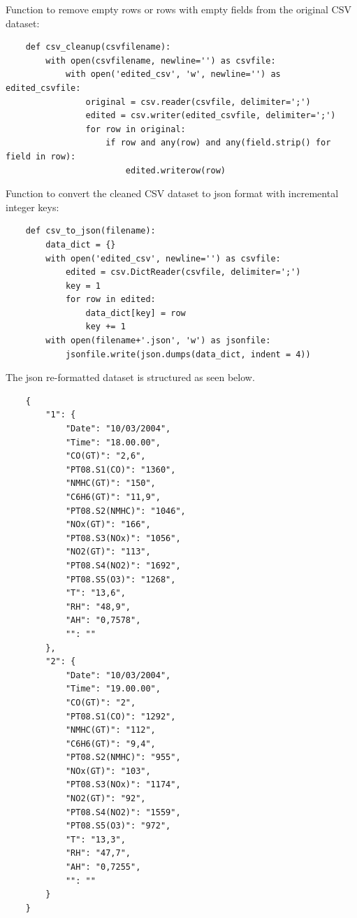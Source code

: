 Function to remove empty rows or rows with empty fields from the original CSV dataset:
\begin{verbatim}
    def csv_cleanup(csvfilename):
        with open(csvfilename, newline='') as csvfile:
            with open('edited_csv', 'w', newline='') as edited_csvfile:
                original = csv.reader(csvfile, delimiter=';')
                edited = csv.writer(edited_csvfile, delimiter=';')
                for row in original:
                    if row and any(row) and any(field.strip() for field in row):
                        edited.writerow(row)
\end{verbatim}

Function to convert the cleaned CSV dataset to json format with incremental integer keys:
\begin{verbatim}
    def csv_to_json(filename):
        data_dict = {}
        with open('edited_csv', newline='') as csvfile:
            edited = csv.DictReader(csvfile, delimiter=';')
            key = 1
            for row in edited: 
                data_dict[key] = row
                key += 1
        with open(filename+'.json', 'w') as jsonfile:
            jsonfile.write(json.dumps(data_dict, indent = 4))
\end{verbatim}

The json re-formatted dataset is structured as seen below.

\begin{verbatim}
    {
        "1": {
            "Date": "10/03/2004",
            "Time": "18.00.00",
            "CO(GT)": "2,6",
            "PT08.S1(CO)": "1360",
            "NMHC(GT)": "150",
            "C6H6(GT)": "11,9",
            "PT08.S2(NMHC)": "1046",
            "NOx(GT)": "166",
            "PT08.S3(NOx)": "1056",
            "NO2(GT)": "113",
            "PT08.S4(NO2)": "1692",
            "PT08.S5(O3)": "1268",
            "T": "13,6",
            "RH": "48,9",
            "AH": "0,7578",
            "": ""
        },
        "2": {
            "Date": "10/03/2004",
            "Time": "19.00.00",
            "CO(GT)": "2",
            "PT08.S1(CO)": "1292",
            "NMHC(GT)": "112",
            "C6H6(GT)": "9,4",
            "PT08.S2(NMHC)": "955",
            "NOx(GT)": "103",
            "PT08.S3(NOx)": "1174",
            "NO2(GT)": "92",
            "PT08.S4(NO2)": "1559",
            "PT08.S5(O3)": "972",
            "T": "13,3",
            "RH": "47,7",
            "AH": "0,7255",
            "": ""
        }
    }
\end{verbatim}

